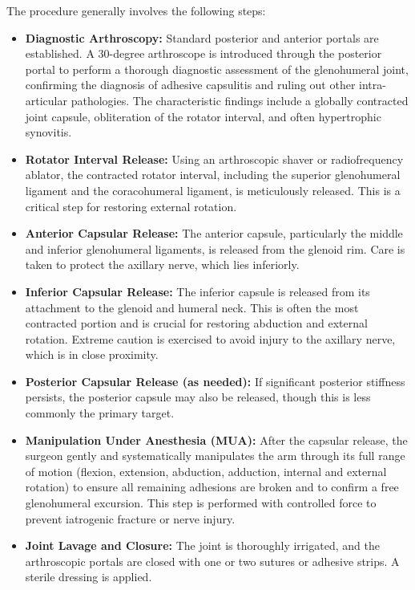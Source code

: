 The procedure generally involves the following steps:

\begin{itemize}
  \item \textbf{Diagnostic Arthroscopy:} Standard posterior and anterior portals are established. A 30-degree arthroscope is introduced through the posterior portal to perform a thorough diagnostic assessment of the glenohumeral joint, confirming the diagnosis of adhesive capsulitis and ruling out other intra-articular pathologies. The characteristic findings include a globally contracted joint capsule, obliteration of the rotator interval, and often hypertrophic synovitis.
  
  \item \textbf{Rotator Interval Release:} Using an arthroscopic shaver or radiofrequency ablator, the contracted rotator interval, including the superior glenohumeral ligament and the coracohumeral ligament, is meticulously released. This is a critical step for restoring external rotation.
  
  \item \textbf{Anterior Capsular Release:} The anterior capsule, particularly the middle and inferior glenohumeral ligaments, is released from the glenoid rim. Care is taken to protect the axillary nerve, which lies inferiorly.
  
  \item \textbf{Inferior Capsular Release:} The inferior capsule is released from its attachment to the glenoid and humeral neck. This is often the most contracted portion and is crucial for restoring abduction and external rotation. Extreme caution is exercised to avoid injury to the axillary nerve, which is in close proximity.
  
  \item \textbf{Posterior Capsular Release (as needed):} If significant posterior stiffness persists, the posterior capsule may also be released, though this is less commonly the primary target.
  
  \item \textbf{Manipulation Under Anesthesia (MUA):} After the capsular release, the surgeon gently and systematically manipulates the arm through its full range of motion (flexion, extension, abduction, adduction, internal and external rotation) to ensure all remaining adhesions are broken and to confirm a free glenohumeral excursion. This step is performed with controlled force to prevent iatrogenic fracture or nerve injury.
  
  \item \textbf{Joint Lavage and Closure:} The joint is thoroughly irrigated, and the arthroscopic portals are closed with one or two sutures or adhesive strips. A sterile dressing is applied.
\end{itemize}

